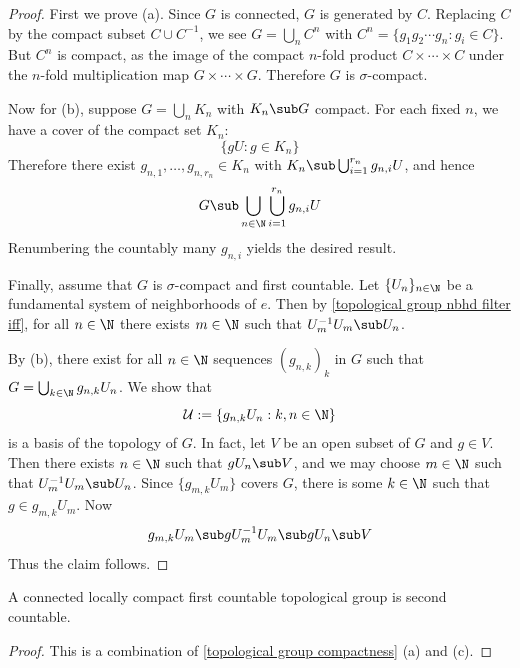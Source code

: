 \begin{proof}
First we prove (a). Since $G$ is connected, $G$ is generated by $C$. Replacing $C$ by the compact subset $C\cup C^{-1}$, we see $G=\bigcup_nC^n$ with $C^n=\{g_1g_2\cdots g_n:g_i\in C\}$. But $C^n$ is compact, as the image of the compact $n$-fold product $C\times\cdots\times C$ under the $n$-fold multiplication map $G\times\cdots\times G$. Therefore $G$ is $\sigma$-compact.\par
Now for (b), suppose $G=\bigcup_nK_n$ with $K_n\sub G$ compact. For each fixed $n$, we have a cover of the compact set $K_n$:
\[\{gU:g\in K_n\}\] 
Therefore there exist $g_{n,1},\dots,g_{n,r_n}\in K_n$ with $K_n\sub\bigcup_{i=1}^{r_n}g_{n,i}U$, and hence
\[G\sub\bigcup_{n\in\N}\bigcup_{i=1}^{r_n}g_{n,i}U\] 
Renumbering the countably many $g_{n,i}$ yields the desired result.\par
Finally, assume that $G$ is $\sigma$-compact and first countable. Let $\{U_n\}_{n\in\N}$ be a fundamental system of neighborhoods of $e$. Then by 
\cref{topological group nbhd filter iff}, for all $n\in\N$ there exists $m\in\N$ such that $U^{-1}_mU_m\sub U_n$.\par 
By (b), there exist for all $n\in\N$ sequences $(g_{n,k})_k$ in $G$ such that $G=\bigcup_{k\in\N}g_{n,k}U_n$. We show that 
\[\mathcal{U}:=\{g_{n,k}U_n:k,n\in\N\}\]
is a basis of the topology of $G$. In fact, let $V$ be an open subset of $G$ and $g\in V$. Then there exists $n\in\N$ such that $gU_n\sub V$, and we may choose $m\in\N$ such that $U^{-1}_mU_m\sub U_n$. Since $\{g_{m,k}U_m\}$ covers $G$, there is some $k\in\N$ such that $g\in g_{m,k}U_m$. Now
\[g_{m,k}U_m\sub gU_m^{-1}U_m\sub gU_n\sub V\]
Thus the claim follows.
\end{proof}
\begin{corollary}
A connected locally compact first countable topological group is second countable.
\end{corollary}
\begin{proof}
This is a combination of \cref{topological group compactness} (a) and (c).
\end{proof}
